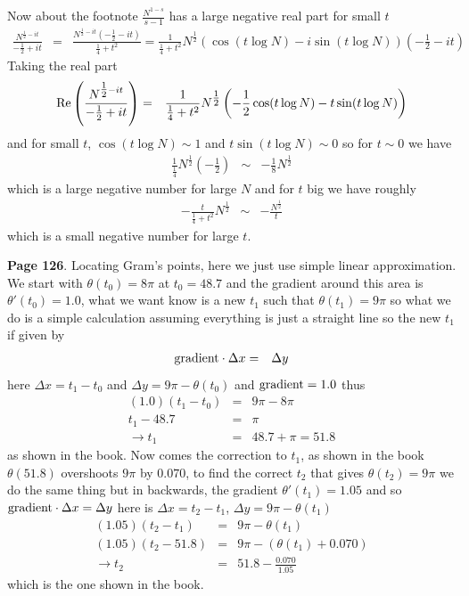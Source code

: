 \documentclass[aps,preprint,preprintnumbers,nofootinbib,showpacs,prd]{revtex4-1}
\newcommand{\nbea}{\begin{eqnarray*}}
\newcommand{\neea}{\end{eqnarray*}}
\newcommand{\re}{{\rm Re}}
\begin{document}
Now about the footnote $\frac{N^{1-s}}{s-1}$ has a large negative real part for small $t$
%
\nbea
\frac{N^{\tfrac{1}{2} - it}}{-\tfrac{1}{2}+it} & = & \frac{N^{\tfrac{1}{2} - it} (-\tfrac{1}{2} - it)}{\tfrac{1}{4} + t^2} = \frac{1}{\tfrac{1}{4} + t^2} N^{\tfrac{1}{2}} \left ( \cos (t\log N)  - i \sin (t\log N)\right ) \left ( -\frac{1}{2} - it \right)
\neea
%
Taking the real part
%
\nbea
\re \left ( \frac{N^{\tfrac{1}{2} - it}}{-\tfrac{1}{2}+it} \right ) & = & \frac{1}{\tfrac{1}{4} + t^2} N^{\tfrac{1}{2}} \left ( -\frac{1}{2}\cos (t\log N)  - t \sin (t\log N)\right )
\neea
%
and for small $t$, $\cos(t \log N) \sim 1$ and $t \sin (t \log N) \sim 0$ so for $t \sim 0$ we have
%
\nbea
\frac{1}{\tfrac{1}{4}} N^{\tfrac{1}{2}} \left ( -\frac{1}{2} \right ) & \sim & -\frac{1}{8} N^{\tfrac{1}{2}}
\neea
%
which is a large negative number for large $N$ and for $t$ big we have roughly
%
\nbea
- \frac{t}{\tfrac{1}{4} + t^2} N^{\tfrac{1}{2}} & \sim & -\frac{N^{\tfrac{1}{2}}}{t}
\neea
%
which is a small negative number for large $t$.

{\bf Page 126}. Locating Gram's points, here we just use simple linear approximation. We start with $\theta(t_0) = 8\pi$ at $t_0 = 48.7$ and the gradient around this area is $\theta'(t_0) = 1.0$, what we want know is a new $t_1$ such that $\theta(t_1) = 9\pi$ so what we do is a simple calculation assuming everything is just a straight line so the new $t_1$ if given by
%
\nbea
{\rm gradient}\cdot \Delta x & = & \Delta y
\neea
%
here $\Delta x = t_1 - t_0$ and $\Delta y = 9\pi - \theta(t_0)$ and ${\rm gradient} = 1.0$ thus
%
\nbea
(1.0) (t_1 - t_0) & = & 9\pi - 8\pi \\
t_1 - 48.7 & = & \pi \\
\to t_1 & = & 48.7 + \pi = 51.8
\neea
%
as shown in the book. Now comes the correction to $t_1$, as shown in the book $\theta(51.8)$ overshoots $9\pi$ by $0.070$, to find the correct $t_2$ that gives $\theta(t_2) = 9\pi$ we do the same thing but in backwards, the gradient $\theta'(t_1) = 1.05$ and so ${\rm gradient}\cdot \Delta x = \Delta y$ here is $\Delta x = t_2 - t_1$, $\Delta y = 9\pi - \theta(t_1)$
%
\nbea
(1.05) (t_2 - t_1) & = & 9\pi - \theta(t_1) \\
(1.05) (t_2 - 51.8) & = & 9\pi - (\theta(t_1) + 0.070) \\
\to t_2 & = & 51.8 - \frac{0.070}{1.05}
\neea
%
which is the one shown in the book.
\end{document}
